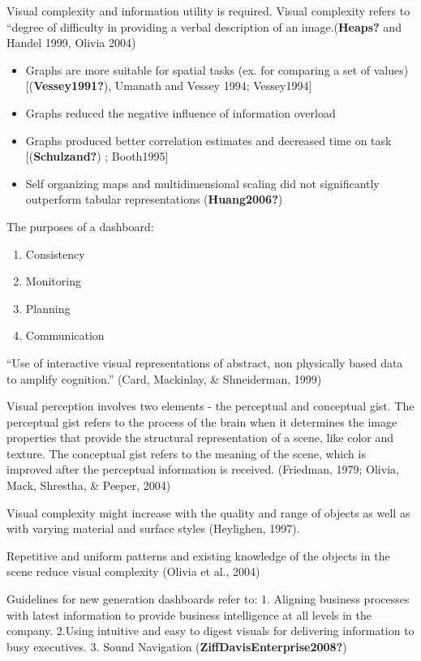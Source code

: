 \documentclass[print]{nuthesis}
\providecommand{\tightlist}{%
  \setlength{\itemsep}{0pt}\setlength{\parskip}{0pt}}
\begin{document}
Visual complexity and information utility is required. Visual complexity refers to ``degree of difficulty in providing a verbal description of an image.(\textbf{Heaps?} and Handel 1999, Olivia 2004)

\begin{itemize}
\tightlist
\item
  Graphs are more suitable for spatial tasks (ex. for comparing a set of values) {[}(\textbf{Vessey1991?}), Umanath and Vessey 1994; Vessey1994{]}
\item
  Graphs reduced the negative influence of information overload
\item
  Graphs produced better correlation estimates and decreased time on task {[}(\textbf{Schulzand?}) ; Booth1995{]}
\item
  Self organizing maps and multidimensional scaling did not significantly outperform tabular representations (\textbf{Huang2006?})
\end{itemize}

The purposes of a dashboard:

\begin{enumerate}
\def\labelenumi{\arabic{enumi}.}
\tightlist
\item
  Consistency
\item
  Monitoring
\item
  Planning
\item
  Communication
\end{enumerate}

``Use of interactive visual representations of abstract, non physically based data to amplify cognition.'' (Card, Mackinlay, \& Shneiderman, 1999)

Visual perception involves two elements - the perceptual and conceptual gist. The perceptual gist refers to the process of the brain when it determines the image properties that provide the structural representation of a scene, like color and texture. The conceptual gist refers to the meaning of the scene, which is improved after the perceptual information is received. (Friedman, 1979; Olivia, Mack, Shrestha, \& Peeper, 2004)

Visual complexity might increase with the quality and range of objects as well as with varying material and surface styles (Heylighen, 1997).

Repetitive and uniform patterns and existing knowledge of the objects in the scene reduce visual complexity (Olivia et al., 2004)

Guidelines for new generation dashboards refer to:
1. Aligning business processes with latest information to provide business intelligence at all levels in the company.
2.Using intuitive and easy to digest visuals for delivering information to busy executives.
3. Sound Navigation
(\textbf{ZiffDavisEnterprise2008?})
\end{document}
